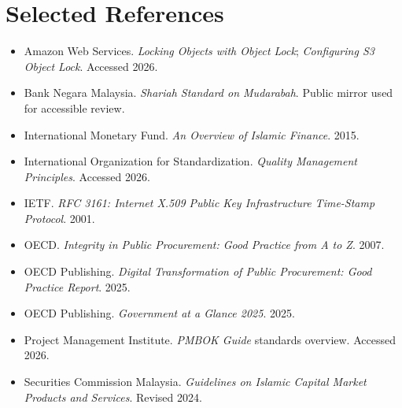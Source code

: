 \documentclass[11pt,a4paper]{article}
\begin{document}
\section*{Selected References}

\begin{itemize}
    \item Amazon Web Services. \emph{Locking Objects with Object Lock}; \emph{Configuring S3 Object Lock}. Accessed 2026.
    \item Bank Negara Malaysia. \emph{Shariah Standard on Mudarabah}. Public mirror used for accessible review.
    \item International Monetary Fund. \emph{An Overview of Islamic Finance}. 2015.
    \item International Organization for Standardization. \emph{Quality Management Principles}. Accessed 2026.
    \item IETF. \emph{RFC 3161: Internet X.509 Public Key Infrastructure Time-Stamp Protocol}. 2001.
    \item OECD. \emph{Integrity in Public Procurement: Good Practice from A to Z}. 2007.
    \item OECD Publishing. \emph{Digital Transformation of Public Procurement: Good Practice Report}. 2025.
    \item OECD Publishing. \emph{Government at a Glance 2025}. 2025.
    \item Project Management Institute. \emph{PMBOK Guide} standards overview. Accessed 2026.
    \item Securities Commission Malaysia. \emph{Guidelines on Islamic Capital Market Products and Services}. Revised 2024.
\end{itemize}
\end{document}
